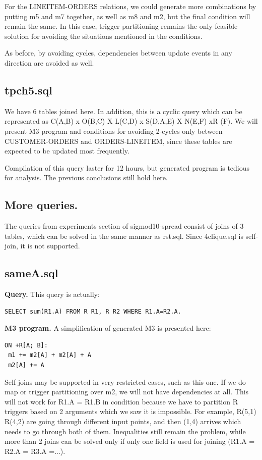 \documentclass{sig-semester}
\begin{document}
For the LINEITEM-ORDERS relations, we could generate more combinations by putting m5 and m7 together, as well as m8 and m2, but the final condition will remain the same. In this case, trigger partitioning remains the only feasible solution for avoiding the situations mentioned in the conditions.

As before, by avoiding cycles, dependencies between update events in any direction are avoided as well.

\subsection{tpch5.sql} We have 6 tables joined here. In addition, this is a cyclic query which can be represented as C(A,B) x O(B,C) X L(C,D) x S(D,A,E) X N(E,F) xR (F). We will present M3 program and conditions for avoiding 2-cycles only between CUSTOMER-ORDERS and ORDERS-LINEITEM, since these tables are expected to be updated most frequently.

Compilation of this query laster for 12 hours, but generated program is tedious for analysis. The previous conclusions still hold here.

\subsection{More queries.}
The queries from experiments section of sigmod10-spread consist of joins of 3 tables, which can be solved in the same manner as rst.sql. Since 4clique.sql is self-join, it is not supported.

\subsection{sameA.sql}
\textbf{Query.} This query is actually:
\begin{verbatim}
SELECT sum(R1.A) FROM R R1, R R2 WHERE R1.A=R2.A.
\end{verbatim}

\textbf{M3 program.} A simplification of generated M3 is presented here:
\begin{verbatim}
ON +R[A; B]: 
 m1 += m2[A] + m2[A] + A
 m2[A] += A
\end{verbatim}

Self joins may be supported in very restricted cases, such as this one. If we do map or trigger partitioning over m2, we will not have dependencies at all. This will not work for R1.A = R1.B in condition because we have to partition R triggers based on 2 arguments which we saw it is impossible. For example, R(5,1) R(4,2) are going through different input points, and then (1,4) arrives which needs to go through both of them. Inequalities still remain the problem, while more than 2 joins can be solved only if only one field is used for joining (R1.A = R2.A = R3.A =...).
\end{document}
